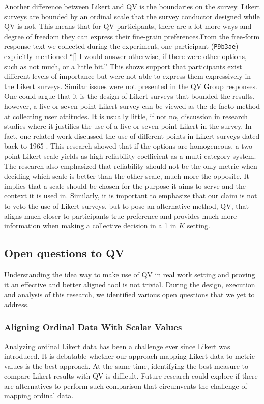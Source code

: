 Another difference between Likert and QV is the boundaries on the survey. Likert surveys are bounded by an ordinal scale that the survey conductor designed while QV is not. This means that for QV participants, there are a lot more ways and degree of freedom they can express their fine-grain preferences.From the free-form response text we collected during the experiment, one participant (\texttt{P9b3ae}) explicitly mentioned ``[\textellipsis] I would answer otherwise, if there were other options, such as not much, or a little bit.'' This shows support that participants exist different levels of importance but were not able to express them expressively in the Likert surveys. Similar issues were not presented in the QV Group responses. One could argue that it is the design of Likert surveys that bounded the results, however, a five or seven-point Likert survey can be viewed as the de facto method at collecting user attitudes. It is usually little, if not no, discussion in research studies where it justifies the use of a five or seven-point Likert in the survey. In fact, one related work discussed the use of different points in Likert surveys dated back to 1965 \cite{komorita1965number}. This research showed that if the options are homogeneous, a two-point Likert scale yields as high-reliability coefficient as a multi-category system. The research also emphasized that reliability should not be the only metric when deciding which scale is better than the other scale, much more the opposite. It implies that a scale should be chosen for the purpose it aims to serve and the context it is used in. Similarly, it is important to emphasize that our claim is not to veto the use of Likert surveys, but to pose an alternative method, QV, that aligns much closer to participants true preference and provides much more information when making a collective decision in a 1 in $K$ setting.



\subsection{Open questions to QV}
Understanding the idea way to make use of QV in real work setting and proving it an effective and better aligned tool is not trivial. During the design, execution and analysis of this research, we identified various open questions that we yet to address. 

\subsubsection{Aligning Ordinal Data With Scalar Values}
Analyzing ordinal Likert data has been a challenge ever since Likert was introduced. It is debatable whether our approach mapping Likert data to metric values is the best approach. At the same time, identifying the best measure to compare Likert results with QV is difficult. Future research could explore if there are alternatives to perform such comparison that circumvents the challenge of mapping ordinal data. 

